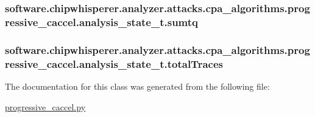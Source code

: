 \subsubsection[{sumtq}]{\setlength{\rightskip}{0pt plus 5cm}software.\+chipwhisperer.\+analyzer.\+attacks.\+cpa\+\_\+algorithms.\+progressive\+\_\+caccel.\+analysis\+\_\+state\+\_\+t.\+sumtq}\label{classsoftware_1_1chipwhisperer_1_1analyzer_1_1attacks_1_1cpa__algorithms_1_1progressive__caccel_1_1analysis__state__t_a620c11a2802bb42bc97838f954573763}
\hypertarget{classsoftware_1_1chipwhisperer_1_1analyzer_1_1attacks_1_1cpa__algorithms_1_1progressive__caccel_1_1analysis__state__t_a99a62e22dca029cbaab063b2d51c8e1f}{}
\subsubsection[{total\+Traces}]{\setlength{\rightskip}{0pt plus 5cm}software.\+chipwhisperer.\+analyzer.\+attacks.\+cpa\+\_\+algorithms.\+progressive\+\_\+caccel.\+analysis\+\_\+state\+\_\+t.\+total\+Traces}\label{classsoftware_1_1chipwhisperer_1_1analyzer_1_1attacks_1_1cpa__algorithms_1_1progressive__caccel_1_1analysis__state__t_a99a62e22dca029cbaab063b2d51c8e1f}


The documentation for this class was generated from the following file\+:\begin{DoxyCompactItemize}
\item 
\hyperlink{progressive__caccel_8py}{progressive\+\_\+caccel.\+py}\end{DoxyCompactItemize}
